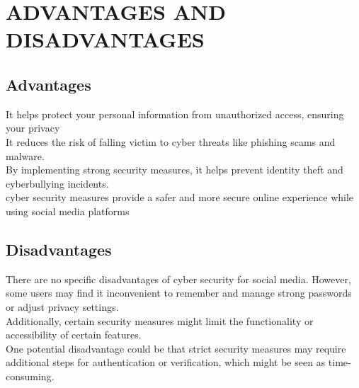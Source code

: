 \chapter{ADVANTAGES AND DISADVANTAGES}
\section{Advantages}
\bibitem{}It helps protect your personal information from unauthorized access, ensuring your privacy \\

\bibitem{}It reduces the risk of falling victim to cyber threats like phishing scams and malware.  \\

\bibitem{}By implementing strong security measures, it helps prevent identity theft and cyberbullying incidents.
\\

\bibitem{}cyber security measures provide a safer and more secure online experience while using social media platforms
  \\
  \section{Disadvantages}

There are no specific disadvantages of cyber security for social media. However, some users may find it inconvenient to remember and manage strong passwords or adjust privacy settings.
\\

Additionally, certain security measures might limit the functionality or accessibility of certain features. 
\\
    
One potential disadvantage could be that strict security measures may require additional steps for authentication or verification, which might be seen as time-consuming. 
\\

